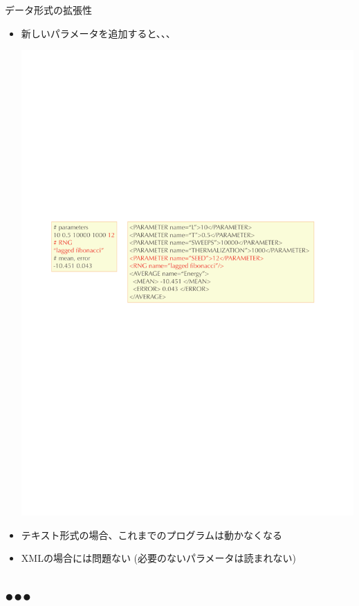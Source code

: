 \begin{frame}{データ形式の拡張性}
  \begin{itemize}
  \item 新しいパラメータを追加すると、、、
  \begin{center}
    \includegraphics[width=.8\textwidth]{xml4.pdf}
  \end{center}
  \item テキスト形式の場合、これまでのプログラムは動かなくなる
  \item XMLの場合には問題ない (必要のないパラメータは読まれない)
  \end{itemize}
\end{frame}

\subsection*{{\protect\color{red}●}{\protect\color{blue}●}{\protect\color{green}●}}

